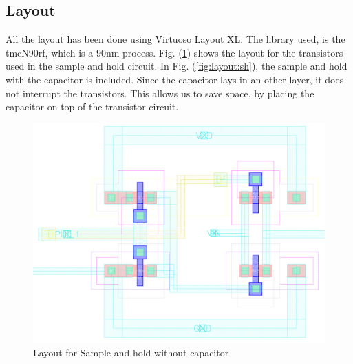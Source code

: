 \documentclass[english, 12pt, a4paper]{ifimaster}
\begin{document}
\subsection{Layout}
All the layout has been done using Virtuoso Layout XL. The library used, is the
tmcN90rf, which is a 90nm process. Fig. (\ref{fig:layout:sh:u:cap}) shows
the layout for the transistors used in the sample and hold circuit. In 
Fig. (\ref{fig:layout:sh}), the sample and hold with the capacitor is included. 
Since the capacitor lays in an other layer, it does not interrupt the transistors. 
This allows us to save space, by placing the capacitor on top of the transistor circuit.
\begin{figure}[!ht]
 \centering
 \includegraphics[width=\textwidth]{img/layout/sample_hold_u_cap}
 \caption{Layout for Sample and hold without capacitor}
 \label{fig:layout:sh:u:cap}
\end{figure}
\end{document}
